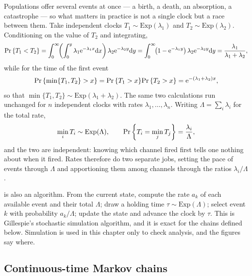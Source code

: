 Populations offer several events at once --- a birth, a death, an absorption, a
catastrophe --- so what matters in practice is not a single clock but a race between
them. Take independent clocks $T_1\sim\text{Exp}(\lambda_1)$ and
$T_2\sim\text{Exp}(\lambda_2)$. Conditioning on the value of $T_2$ and integrating,
\begin{equation}
\label{eq:race2}
{\text{Pr}\left\{T_1<T_2\right\}}
= \int_0^{\infty}\!\!\left(\int_0^{y}\lambda_1{\rm e}^{-\lambda_1 x}{\rm d} x\right)\lambda_2{\rm e}^{-\lambda_2 y}{\rm d} y
= \int_0^{\infty}\!\!\left(1-{\rm e}^{-\lambda_1 y}\right)\lambda_2{\rm e}^{-\lambda_2 y}{\rm d} y
= \frac{\lambda_1}{\lambda_1+\lambda_2},
\end{equation}
while for the time of the first event
\begin{equation}
\label{eq:min2}
{\text{Pr}\left\{\min\{T_1,T_2\}>x\right\}} = {\text{Pr}\left\{T_1>x\right\}}{\text{Pr}\left\{T_2>x\right\}} = {\rm e}^{-(\lambda_1+\lambda_2)x},
\end{equation}
so that $\min\{T_1,T_2\}\sim\text{Exp}(\lambda_1+\lambda_2)$. The same two calculations
run unchanged for $n$ independent clocks with rates $\lambda_1,\dots,\lambda_n$. Writing
$\Lambda = \sum_i\lambda_i$ for the total rate,
\begin{equation}
\label{eq:racen}
\min_i T_i \sim \text{Exp}(\Lambda),
\qquad
{\text{Pr}\left\{T_i = \min_j T_j\right\}} = \frac{\lambda_i}{\Lambda},
\end{equation}
and the two are independent: knowing which channel fired first tells one nothing about
when it fired. Rates therefore do two separate jobs, setting the pace of events through
$\Lambda$ and apportioning them among channels through the ratios $\lambda_i/\Lambda$.

\begin{remark}[Simulation]
\label{rem:gillespie}
 is also an algorithm. From the current state, compute the rate $a_k$ of
each available event and their total $\Lambda$; draw a holding time
$\tau\sim\text{Exp}(\Lambda)$; select event $k$ with probability $a_k/\Lambda$; update
the state and advance the clock by $\tau$. This is Gillespie's stochastic simulation
algorithm, and it is exact for the chains defined below. Simulation is used in this
chapter only to check analysis, and the figures say where.
\end{remark}

\subsection{Continuous-time Markov chains}
\label{sec:ctmc}

